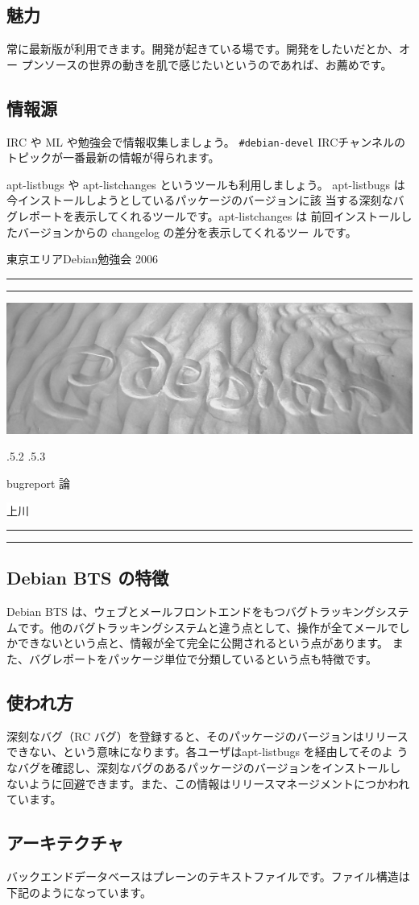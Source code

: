 \documentclass[mingoth,a4paper]{jsarticle}
\makeatletter
\renewcommand{\section}{\@startsection{section}{1}{\z@}%
    {\Cvs \@plus.5\Cdp \@minus.2\Cdp}%
    {.5\Cvs \@plus.3\Cdp}%
    {\normalfont\Huge\headfont\raggedright\centering}} %
\newcommand{\dancersection}[2]{%
\newpage
東京エリアDebian勉強会 2006
\hrule
\vspace{0.5mm}
\hrule
\hfill{}\includegraphics[width=16cm]{image2006-natsu/guruguru-sand-light.png}\\
\vspace{-5cm}
\begin{center}
\section{#1}
\end{center}
\hfill{}\colorbox{white}{#2}\hspace{3cm}\space\\
\vspace{1cm}
\hrule
\vspace{0.5mm}
\hrule
\vspace{1cm}
}
\makeatother
\begin{document}
\subsection{魅力}

常に最新版が利用できます。開発が起きている場です。開発をしたいだとか、オー
プンソースの世界の動きを肌で感じたいというのであれば、お薦めです。

\subsection{情報源}

IRC や ML や勉強会で情報収集しましょう。
\verb!#debian-devel! IRCチャンネルのトピックが一番最新の情報が得られます。

apt-listbugs や apt-listchanges というツールも利用しましょう。
apt-listbugs は今インストールしようとしているパッケージのバージョンに該
当する深刻なバグレポートを表示してくれるツールです。apt-listchanges は
前回インストールしたバージョンからの changelog の差分を表示してくれるツー
ルです。

\dancersection{bugreport 論}{上川}

\subsection{Debian BTS の特徴}

Debian BTS は、ウェブとメールフロントエンドをもつバグトラッキングシステ
ムです。他のバグトラッキングシステムと違う点として、操作が全てメールでし
かできないという点と、情報が全て完全に公開されるという点があります。
また、バグレポートをパッケージ単位で分類しているという点も特徴です。

\subsection{使われ方}

深刻なバグ（RC バグ）を登録すると、そのパッケージのバージョンはリリース
できない、という意味になります。各ユーザはapt-listbugs を経由してそのよ
うなバグを確認し、深刻なバグのあるパッケージのバージョンをインストールし
ないように回避できます。また、この情報はリリースマネージメントにつかわれ
ています。

\subsection{アーキテクチャ}

バックエンドデータベースはプレーンのテキストファイルです。ファイル構造は
下記のようになっています。
\end{document}

